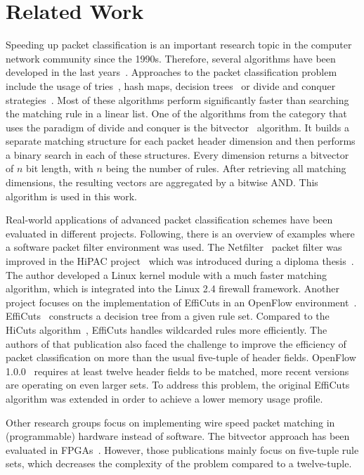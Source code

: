 \documentclass[conference]{IEEEtran}
\begin{document}
\section{Related Work}
Speeding up packet classification is an important research topic in the computer network community since the 1990s.
Therefore, several algorithms have been developed in the last years~\cite{algorithms_survey}.
Approaches to the packet classification problem include the usage of tries~\cite{tries}, 
hash maps, decision trees~\cite{hicuts, efficuts, hypercuts} or divide and conquer strategies~\cite{bv}.
Most of these algorithms perform significantly faster than searching the matching rule in a linear list.
One of the algorithms from the category that uses the paradigm of divide and conquer is the bitvector~\cite{bv} algorithm.
It builds a separate matching structure for each packet header dimension and 
then performs a binary search in each of these structures.
Every dimension returns a bitvector of $n$ bit length, with $n$ being the number of rules.
After retrieving all matching dimensions, the resulting vectors are aggregated by a bitwise AND.
This algorithm is used in this work.

Real-world applications of advanced packet classification schemes have been evaluated in different projects.
Following, there is an overview of examples where a software packet filter environment was used.
The Netfilter~\cite{netfilter} packet filter was improved in the HiPAC project~\cite{hipac} 
which was introduced during a diploma thesis~\cite{heinzhigh}.
The author developed a Linux kernel module with a much faster matching algorithm, 
which is integrated into the Linux 2.4 firewall framework.
Another project focuses on the implementation of EffiCuts in an OpenFlow environment~\cite{stimpfling2013optimal}.
EffiCuts~\cite{efficuts} constructs a decision tree from a given rule set.
Compared to the HiCuts algorithm~\cite{hicuts}, EffiCuts handles wildcarded rules more efficiently.
The authors of that publication also faced the challenge to improve the efficiency 
of packet classification on more than the usual five-tuple of header fields.
OpenFlow 1.0.0~\cite{openflow_spec10} requires at least twelve header fields to 
be matched, more recent versions are operating on even larger sets.
To address this problem, the original EffiCuts algorithm was extended in order to achieve a lower memory usage profile.

Other research groups focus on implementing wire speed packet matching in (programmable) hardware instead of software.
The bitvector approach has been evaluated in FPGAs~\cite{bitvector_fpga, qu2013fast}.
However, those publications mainly focus on five-tuple rule sets, which decreases 
the complexity of the problem compared to a twelve-tuple.
\end{document}
